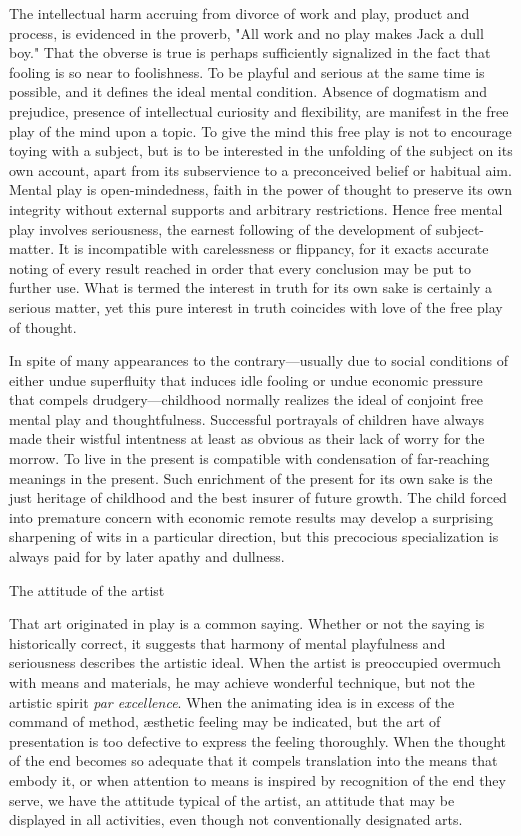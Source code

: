 \documentclass[letterpaper]{book}
\begin{document}
The intellectual harm accruing from divorce of work and play, product
and process, is evidenced in the proverb, "All work and no play makes
Jack a dull boy." That the obverse is true is perhaps sufficiently
signalized in the fact that fooling is so near to foolishness. To be
playful and serious at the same time is possible, and it defines the
ideal mental condition. Absence of dogmatism and prejudice, presence of
intellectual curiosity and flexibility, are manifest in the free play of
the mind upon a topic. To give the mind
this
free play is not to encourage toying with a subject, but is to be
interested in the unfolding of the subject on its own account, apart
from its subservience to a preconceived belief or habitual aim. Mental
play is open-mindedness, faith in the power of thought to preserve its
own integrity without external supports and arbitrary restrictions.
Hence free mental play involves seriousness, the earnest following of
the development of subject-matter. It is incompatible with carelessness
or flippancy, for it exacts accurate noting of every result reached in
order that every conclusion may be put to further use. What is termed
the interest in truth for its own sake is certainly a serious matter,
yet this pure interest in truth coincides with love of the free play of
thought.

In spite of many appearances to the contrary---usually due to social
conditions of either undue superfluity that induces idle fooling or
undue economic pressure that compels drudgery---childhood normally
realizes the ideal of conjoint free mental play and thoughtfulness.
Successful portrayals of children have always made their wistful
intentness at least as obvious as their lack of worry for the morrow. To
live in the present is compatible with condensation of far-reaching
meanings in the present. Such enrichment of the present for its own sake
is the just heritage of childhood and the best insurer of future growth.
The child forced into premature concern with economic remote results may
develop a surprising sharpening of wits in a particular direction, but
this precocious specialization is always paid for by later apathy and
dullness.

The attitude of the artist

That art originated in play is a common saying. Whether or not the
saying is historically correct,
it
suggests that harmony of mental playfulness and seriousness describes
the artistic ideal. When the artist is preoccupied overmuch with means
and materials, he may achieve wonderful technique, but not the artistic
spirit \emph{par excellence}. When the animating idea is in excess of
the command of method, æsthetic feeling may be indicated, but the art of
presentation is too defective to express the feeling thoroughly. When
the thought of the end becomes so adequate that it compels translation
into the means that embody it, or when attention to means is inspired by
recognition of the end they serve, we have the attitude typical of the
artist, an attitude that may be displayed in all activities, even though
not conventionally designated arts.
\end{document}
